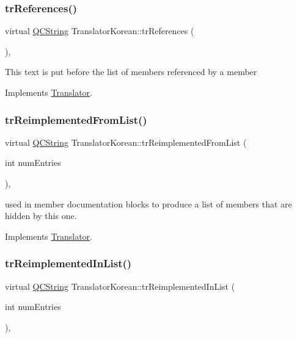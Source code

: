 \subsubsection{\texorpdfstring{trReferences()}{trReferences()}}
{\footnotesize\ttfamily virtual \mbox{\hyperlink{class_q_c_string}{Q\+C\+String}} Translator\+Korean\+::tr\+References (\begin{DoxyParamCaption}{ }\end{DoxyParamCaption})\hspace{0.3cm}{\ttfamily [inline]}, {\ttfamily [virtual]}}

This text is put before the list of members referenced by a member 

Implements \mbox{\hyperlink{class_translator}{Translator}}.

\mbox{\label{class_translator_korean_adb280dfe0d68931720084415a0acf4ce}} 
\subsubsection{\texorpdfstring{trReimplementedFromList()}{trReimplementedFromList()}}
{\footnotesize\ttfamily virtual \mbox{\hyperlink{class_q_c_string}{Q\+C\+String}} Translator\+Korean\+::tr\+Reimplemented\+From\+List (\begin{DoxyParamCaption}\item[{int}]{num\+Entries }\end{DoxyParamCaption})\hspace{0.3cm}{\ttfamily [inline]}, {\ttfamily [virtual]}}

used in member documentation blocks to produce a list of members that are hidden by this one. 

Implements \mbox{\hyperlink{class_translator}{Translator}}.

\mbox{\label{class_translator_korean_a0d00fff3f8d45dc50dbba13cdbeeda8e}} 
\subsubsection{\texorpdfstring{trReimplementedInList()}{trReimplementedInList()}}
{\footnotesize\ttfamily virtual \mbox{\hyperlink{class_q_c_string}{Q\+C\+String}} Translator\+Korean\+::tr\+Reimplemented\+In\+List (\begin{DoxyParamCaption}\item[{int}]{num\+Entries }\end{DoxyParamCaption})\hspace{0.3cm}{\ttfamily [inline]}, {\ttfamily [virtual]}}

